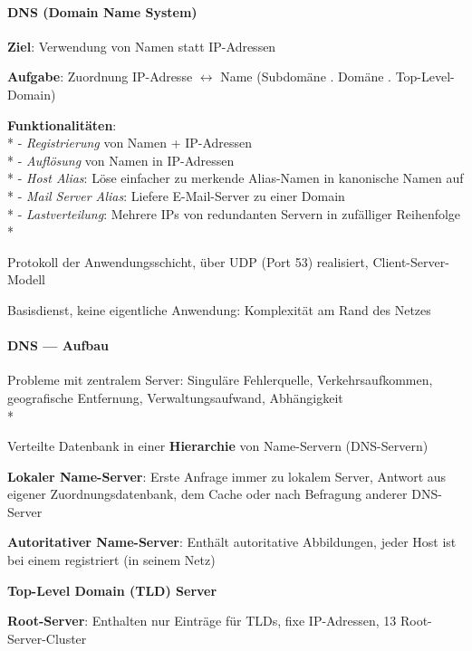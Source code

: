 \paragraph{DNS (Domain Name System)}
\begin{items}
  \item \textbf{Ziel}: Verwendung von Namen statt IP-Adressen
  \item \textbf{Aufgabe}: Zuordnung IP-Adresse \( \leftrightarrow \) Name (Subdomäne . Domäne . Top-Level-Domain)
  \item \textbf{Funktionalitäten}: \\*
    - \emph{Registrierung} von Namen + IP-Adressen \\*
    - \emph{Auflösung} von Namen in IP-Adressen\\*
    - \emph{Host Alias}: Löse einfacher zu merkende Alias-Namen in kanonische Namen auf\\*
    - \emph{Mail Server Alias}: Liefere E-Mail-Server zu einer Domain\\*
    - \emph{Lastverteilung}: Mehrere IPs von redundanten Servern in zufälliger Reihenfolge\\*
    \item Protokoll der Anwendungsschicht, über UDP (Port 53) realisiert, Client-Server-Modell
    \item Basisdienst, keine eigentliche Anwendung: Komplexität am Rand des Netzes
\end{items}

\paragraph{DNS --- Aufbau}
\begin{items}
	\item Probleme mit zentralem Server: Singuläre Fehlerquelle, Verkehrsaufkommen, geografische Entfernung, Verwaltungsaufwand, Abhängigkeit\\*
	
  \item Verteilte Datenbank in einer \textbf{Hierarchie} von Name-Servern (DNS-Servern)
  	\item \textbf{Lokaler Name-Server}: Erste Anfrage immer zu lokalem Server, Antwort aus eigener Zuordnungsdatenbank, dem Cache oder nach Befragung anderer DNS-Server
  	\item \textbf{Autoritativer Name-Server}: Enthält autoritative Abbildungen, jeder Host ist bei einem registriert (in seinem Netz)
  	\item \textbf{Top-Level Domain (TLD) Server}
  	\item \textbf{Root-Server}: Enthalten nur Einträge für TLDs, fixe IP-Adressen, 13 Root-Server-Cluster
\end{items}

